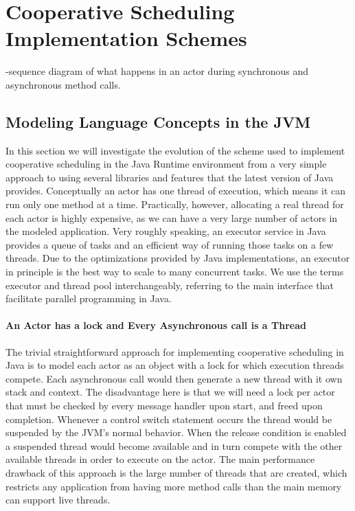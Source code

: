 \section{Cooperative Scheduling Implementation Schemes}
\label{scheme}
-sequence diagram of what happens in an actor during synchronous and asynchronous method calls.

\subsection{Modeling Language Concepts in the JVM}
In this section we will investigate the evolution of the scheme used to implement cooperative scheduling in the Java Runtime environment from a very simple approach to using several libraries and features that the latest version of Java provides. Conceptually an actor has one thread of execution, which means it can run only one method at a time. Practically, however, allocating a real thread for each actor is highly expensive, as we can have a very large number of actors in the modeled application. Very roughly speaking, an executor service in Java provides a queue of tasks and an efficient way of running those tasks on a few threads. Due to the optimizations provided by Java implementations, an executor in principle is the best way to scale to many concurrent tasks. We use the terms executor and thread pool interchangeably, referring to the main interface \cite{execserv} that facilitate parallel programming in Java. 

\paragraph{An Actor has a lock and Every Asynchronous call is a Thread}
The trivial straightforward approach for implementing cooperative scheduling in Java is to model each actor as an object with a lock for which execution threads compete. Each asynchronous call would then generate a new thread with it own stack and context. The disadvantage here is that we will need a lock per actor that must be checked by every message handler upon start, and freed upon completion. Whenever a control switch statement occurs the thread would be suspended by the JVM's normal behavior. When the release condition is enabled a suspended thread would become available and in turn compete with the other available threads in order to execute on the actor. The main performance drawback of this approach is the large number of threads that are created, which restricts any application from having more method calls than the main memory can support live threads.


